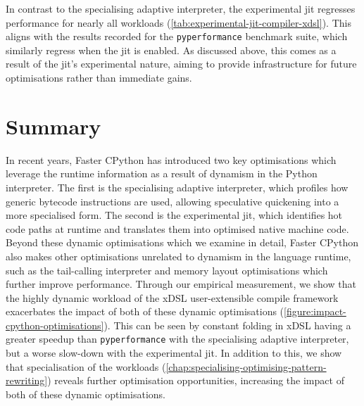 In contrast to the specialising adaptive interpreter, the experimental \ac{jit} regresses performance for nearly all workloads (\autoref{tab:experimental-jit-compiler-xdsl}).
This aligns with the results recorded for the \texttt{pyperformance} benchmark suite, which similarly regress when the \ac{jit} is enabled.
As discussed above, this comes as a result of the \ac{jit}'s experimental nature, aiming to provide infrastructure for future optimisations rather than immediate gains.



\section{Summary}
\label{chap:impact-cpython-pattern-summary}

In recent years, Faster CPython has introduced two key optimisations which leverage the runtime information as a result of dynamism in the Python interpreter.
The first is the specialising adaptive interpreter, which profiles how generic bytecode instructions are used, allowing speculative quickening into a more specialised form. The second is the experimental \ac{jit}, which identifies hot code paths at runtime and translates them into optimised native machine code.
Beyond these dynamic optimisations which we examine in detail, Faster CPython also makes other optimisations unrelated to dynamism in the language runtime, such as the tail-calling interpreter \cite{joshhabermanTailCallingInterpreter2025} and memory layout optimisations which further improve performance.
Through our empirical measurement, we show that the highly dynamic workload of the xDSL user-extensible compile framework exacerbates the impact of both of these dynamic optimisations (\autoref{figure:impact-cpython-optimisations}). This can be seen by constant folding in xDSL having a greater speedup than \texttt{pyperformance} with the specialising adaptive interpreter, but a worse slow-down with the experimental \ac{jit}.
In addition to this, we show that specialisation of the workloads (\autoref{chap:specialising-optimising-pattern-rewriting}) reveals further optimisation opportunities, increasing the impact of both of these dynamic optimisations.

